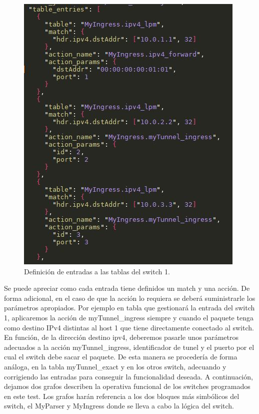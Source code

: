 \newline
\begin{figure}[!htb]
  \centering
    \includegraphics[width=0.7\linewidth]{./img/test/16.JPG}
    \caption{Definición de entradas a las tablas del switch 1.}
  \label{fig:yo}
\end{figure}
\newline
Se puede apreciar como cada entrada tiene definidos un match y una acción. De forma adicional, en el caso de que la acción lo requiera se deberá suministrarle los parámetros apropiados. Por ejemplo en tabla que gestionará la entrada del switch 1, aplicaremos la acción de myTunnel\_ingress siempre y cuando el paquete tenga como destino IPv4 distintas al host 1 que tiene directamente conectado al switch. \newline
\newline
En función, de la dirección destino ipv4, deberemos pasarle unos parámetros adecuados a la acción myTunnel\_ingress, identificador de tunel y el puerto por el cual el switch debe sacar el paquete. De esta manera se procedería de forma análoga, en la tabla myTunnel\_exact y en los otros switch, adecuando y corrigiendo las entradas para conseguir la funcionalidad deseada.  
A continuación, dejamos dos grafos describen la operativa funcional de los switches programados en este test. Los grafos harán referencia a los dos bloques más simbólicos del switch, el MyParser y MyIngress donde se lleva a cabo la lógica del switch. 
\newpage
